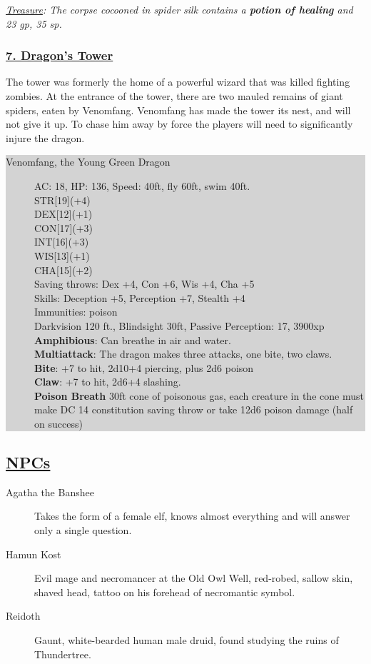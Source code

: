 \emph{\underline{Treasure}: The corpse cocooned in spider silk contains a \textbf{potion of healing} and 23 gp, 35 sp.}

\subsubsection*{\underline{7. Dragon's Tower}}
The tower was formerly the home of a powerful wizard that was killed fighting zombies. At the entrance of the tower, there are two mauled remains of giant spiders, eaten by Venomfang. Venomfang has made the tower its nest, and will not give it up. To chase him away by force the players will need to significantly injure the dragon.

\colorbox{lightgray}{\begin{minipage}{0.4\textwidth}
		\begin{description}
			\item[Venomfang, the Young Green Dragon]
			AC: 18, HP: 136, Speed: 40ft, fly 60ft, swim 40ft.
			\\ STR[19](+4) 
			\\ DEX[12](+1)
			\\ CON[17](+3)
			\\ INT[16](+3)
			\\ WIS[13](+1)
			\\ CHA[15](+2)
			\\ Saving throws: Dex +4, Con +6, Wis +4, Cha +5
			\\ Skills: Deception +5, Perception +7, Stealth +4
			\\ Immunities: poison
			\\ Darkvision 120 ft., Blindsight 30ft, Passive Perception: 17, 3900xp
			\\ \textbf{Amphibious}: Can breathe in air and water.
			\\ \textbf{Multiattack}: The dragon makes three attacks, one bite, two claws.
			\\ \textbf{Bite}: +7 to hit, 2d10+4 piercing, plus 2d6 poison
			\\ \textbf{Claw}: +7 to hit, 2d6+4 slashing.
			\\ \textbf{Poison Breath} 30ft cone of poisonous gas, each creature in the cone must make DC 14 constitution saving throw or take 12d6 poison damage (half on success)
		\end{description}
\end{minipage}}
\break


\subsection{\underline{NPCs}}
\begin{description}
	\item[Agatha the Banshee] Takes the form of a female elf, knows almost everything and will answer only a single question.
	\item[Hamun Kost] Evil mage and necromancer at the Old Owl Well, red-robed, sallow skin, shaved head, tattoo on his forehead of necromantic symbol.
	\item[Reidoth] Gaunt, white-bearded human male druid, found studying the ruins of Thundertree.
\end{description}